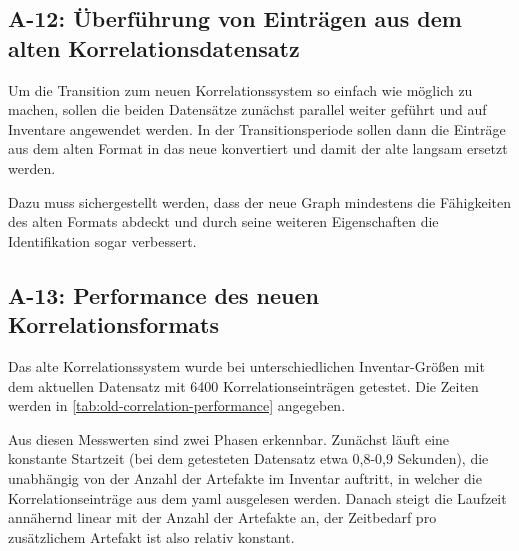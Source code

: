 \subsection{A-12: Überführung von Einträgen aus dem alten Korrelationsdatensatz}\label{subsec:req-current-dataset-conversion}

Um die Transition zum neuen Korrelationssystem so einfach wie möglich zu machen, sollen die beiden Datensätze zunächst parallel weiter geführt und auf Inventare angewendet werden.
In der Transitionsperiode sollen dann die Einträge aus dem alten Format in das neue konvertiert und damit der alte langsam ersetzt werden.

Dazu muss sichergestellt werden, dass der neue Graph mindestens die Fähigkeiten des alten Formats abdeckt und durch seine weiteren Eigenschaften die Identifikation sogar verbessert.

\subsection{A-13: Performance des neuen Korrelationsformats}\label{subsec:req-correlation-format-performance}

Das alte Korrelationssystem wurde bei unterschiedlichen Inventar-Größen mit dem aktuellen Datensatz mit 6400 Korrelationseinträgen getestet.
Die Zeiten werden in \autoref{tab:old-correlation-performance} angegeben.

Aus diesen Messwerten sind zwei Phasen erkennbar.
Zunächst läuft eine konstante Startzeit (bei dem getesteten Datensatz etwa 0,8-0,9 Sekunden), die unabhängig von der Anzahl der Artefakte im Inventar auftritt, in welcher die Korrelationseinträge aus dem \acrshort{yaml} ausgelesen werden.
Danach steigt die Laufzeit annähernd linear mit der Anzahl der Artefakte an, der Zeitbedarf pro zusätzlichem Artefakt ist also relativ konstant.

